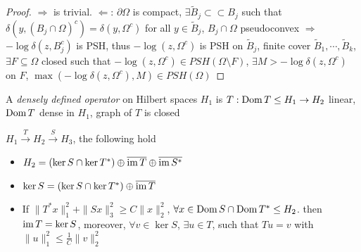 \documentclass[../main.tex]{subfiles}
\begin{document}
\begin{proof}
$\Rightarrow$ is trivial. $\Leftarrow$: $\partial\Omega$ is compact, $\exists\tilde B_j\subset\subset B_j$ such that $\delta(y,(B_j\cap\Omega)^c)=\delta(y,\Omega^c)$ for all $y\in\tilde B_j$, $B_j\cap\Omega$ pseudoconvex $\Rightarrow$ $-\log\delta(z,B_j^c)$ is PSH, thus $-\log(z,\Omega^c)$ is PSH on $\tilde B_j$, finite cover $\tilde B_1,\cdots,\tilde B_k$, $\exists F\subseteq\Omega$ closed such that $-\log(z,\Omega^c)\in PSH(\Omega\setminus F)$, $\exists M>-\log\delta(z,\Omega^c)$ on $F$, $\max(-\log\delta(z,\Omega^c),M)\in PSH(\Omega)$
\end{proof}

\begin{definition}
A \textit{densely defined operator} on Hilbert spaces $H_1$ is $T:\operatorname{Dom} T\leq H_1\to H_2$ linear, $\operatorname{Dom} T$ dense in $H_1$, graph of $T$ is closed
\end{definition}

\begin{theorem}
$H_1\xrightarrow TH_2\xrightarrow SH_3$, the following hold
\begin{itemize}
\item $H_2=(\ker S\cap\ker T^*)\oplus\overline{\operatorname{im} T}\oplus\overline{\operatorname{im} S^*}$
\item $\ker S=(\ker S\cap \ker T^*)\oplus\overline{\operatorname{im} T}$
\item If $\|T^*x\|^2_1+\|Sx\|^2_3\geq C\|x\|^2_2$, $\forall x\in\operatorname{Dom} S\cap\operatorname{Dom} T^*\leq H_2$. then $\operatorname{im} T=\ker S$, moreover, $\forall v\in\ker S$, $\exists u\in T$, such that $Tu=v$ with $\|u\|^2_1\leq\frac{1}{C}\|v\|^2_2$
\end{itemize}
\end{theorem}
\end{document}

